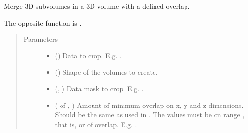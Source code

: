 \documentclass[letterpaper,10pt,english]{sphinxmanual}
\begin{document}

\begin{fulllineitems}
\label{\detokenize{data/data_3d_manipulation:data.data_3D_manipulation.merge_3D_data_with_overlap}}
Merge 3D subvolumes in a 3D volume with a defined overlap.

The opposite function is {\hyperref[\detokenize{data/data_3d_manipulation:data.data_3D_manipulation.crop_3D_data_with_overlap}]{}}.
\begin{quote}\begin{description}
\item[{Parameters}] \leavevmode\begin{itemize}
\item {} 
 () \textendash{} Data to crop. E.g. .

\item {} 
 () \textendash{} Shape of the volumes to create.

\item {} 
 (, ) \textendash{} Data mask to crop. E.g. .

\item {} 
 ( of , ) \textendash{} Amount of minimum overlap on x, y and z dimensions. Should be the same as used in
{\hyperref[\detokenize{data/data_3d_manipulation:data.data_3D_manipulation.crop_3D_data_with_overlap}]{}}. The values must be on range \sphinxcode{\sphinxupquote{{[}0, 1)}}, that is,  or  of
overlap. E.g. .


\end{itemize}
\end{description}
\end{quote}
\end{fulllineitems}
\end{document}
